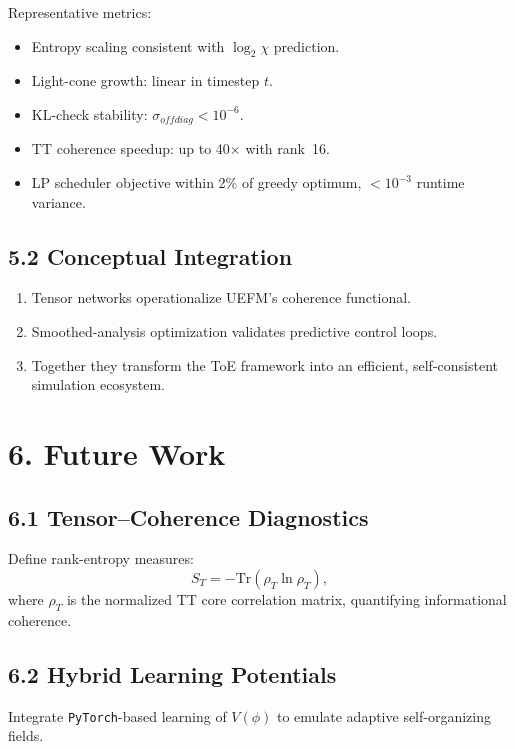 \documentclass[11pt]{article}
\begin{document}
Representative metrics:
\begin{itemize}
    \item Entropy scaling consistent with $\log_2 \chi$ prediction.
    \item Light-cone growth: linear in timestep $t$.
    \item KL-check stability: $\sigma_{offdiag} < 10^{-6}$.
    \item TT coherence speedup: up to 40$\times$ with rank~16.
    \item LP scheduler objective within 2\% of greedy optimum, $<10^{-3}$ runtime variance.
\end{itemize}

\subsection*{5.2 Conceptual Integration}

\begin{enumerate}
    \item Tensor networks operationalize UEFM’s coherence functional.
    \item Smoothed-analysis optimization validates predictive control loops.
    \item Together they transform the ToE framework into an efficient, self-consistent simulation ecosystem.
\end{enumerate}

\section{6. Future Work}

\subsection*{6.1 Tensor–Coherence Diagnostics}
Define rank-entropy measures:
\[
S_T = -\mathrm{Tr}(\rho_T \ln \rho_T),
\]
where $\rho_T$ is the normalized TT core correlation matrix, quantifying informational coherence.

\subsection*{6.2 Hybrid Learning Potentials}
Integrate \texttt{PyTorch}-based learning of $V(\phi)$ to emulate adaptive self-organizing fields.
\end{document}
